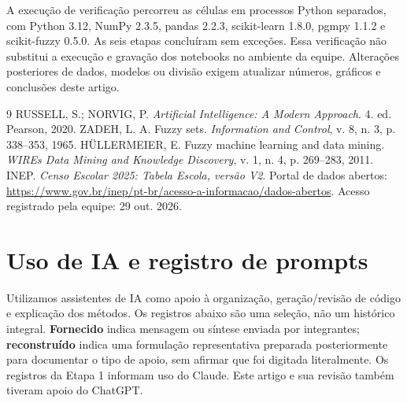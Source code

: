 \documentclass[10pt,a4paper]{article}
\begin{document}
A execução de verificação percorreu as células em processos Python separados, com Python 3.12, NumPy 2.3.5, pandas 2.2.3, scikit-learn 1.8.0, pgmpy 1.1.2 e scikit-fuzzy 0.5.0. As seis etapas concluíram sem exceções. Essa verificação não substitui a execução e gravação dos notebooks no ambiente da equipe. Alterações posteriores de dados, modelos ou divisão exigem atualizar números, gráficos e conclusões deste artigo.

\begin{thebibliography}{9}\small
{} RUSSELL, S.; NORVIG, P. \emph{Artificial Intelligence: A Modern Approach}. 4. ed. Pearson, 2020.
 ZADEH, L. A. Fuzzy sets. \emph{Information and Control}, v. 8, n. 3, p. 338--353, 1965.
 HÜLLERMEIER, E. Fuzzy machine learning and data mining. \emph{WIREs Data Mining and Knowledge Discovery}, v. 1, n. 4, p. 269--283, 2011.
 INEP. \emph{Censo Escolar 2025: Tabela Escola, versão V2}. Portal de dados abertos: \url{https://www.gov.br/inep/pt-br/acesso-a-informacao/dados-abertos}. Acesso registrado pela equipe: 29 out. 2026.
\end{thebibliography}

\newpage
\appendix
\small
\section{Uso de IA e registro de prompts}
Utilizamos assistentes de IA como apoio à organização, geração/revisão de código e explicação dos métodos. Os registros abaixo são uma seleção, não um histórico integral. \textbf{Fornecido} indica mensagem ou síntese enviada por integrantes; \textbf{reconstruído} indica uma formulação representativa preparada posteriormente para documentar o tipo de apoio, sem afirmar que foi digitada literalmente. Os registros da Etapa 1 informam uso do Claude. Este artigo e sua revisão também tiveram apoio do ChatGPT.
\end{document}

